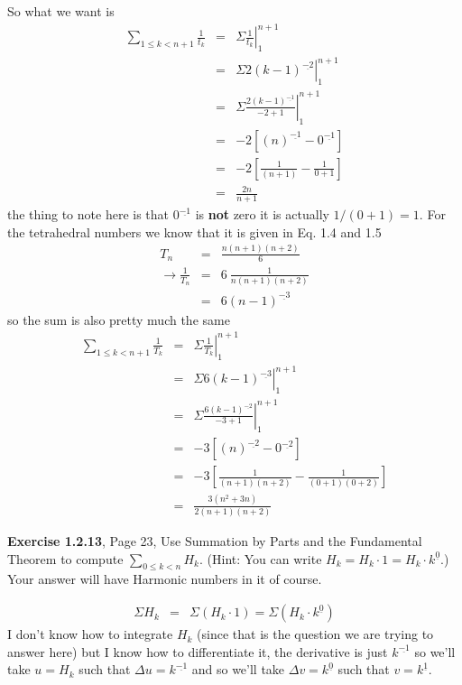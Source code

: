 \documentclass[aps,preprint,preprintnumbers,nofootinbib,showpacs,prd]{revtex4-1}
\newcommand{\nbea}{\begin{eqnarray*}}
\newcommand{\neea}{\end{eqnarray*}}
\begin{document}
So what we want is
%
\nbea
\sum_{1\le k < n+1} \frac{1}{t_k} & = & \left.\Sigma \frac{1}{t_k} \right |_{1}^{n+1} \\
& = & \left.\Sigma 2(k-1)^{\underline{-2}} \right |_{1}^{n+1} \\
& = & \left.\Sigma \frac{2(k-1)^{\underline{-1}}}{-2+1} \right |_{1}^{n+1} \\
& = & -2 \left \lbrack (n)^{\underline{-1}} - 0^{\underline{-1}}\right\rbrack \\
& = & -2\left\lbrack\frac{1}{(n+1)} - \frac{1}{0+1}\right\rbrack \\
& = & \frac{2n}{n+1}
\neea
%
the thing to note here is that $0^{\underline{-1}}$ is {\bf not} zero it is actually $1/(0+1) = 1$. For the tetrahedral numbers we know that it is given in Eq. 1.4 and 1.5
%
\nbea
T_n & = & \frac{n(n+1)(n+2)}{6} \\
\to \frac{1}{T_n} & = & 6~\frac{1}{n(n+1)(n+2)}\\
& = & 6 (n-1)^{\underline{-3}}
\neea
%
so the sum is also pretty much the same
%
\nbea
\sum_{1\le k < n+1} \frac{1}{T_k} & = & \left.\Sigma \frac{1}{T_k} \right |_{1}^{n+1} \\
& = & \left.\Sigma 6(k-1)^{\underline{-3}} \right |_{1}^{n+1} \\
& = & \left.\Sigma \frac{6(k-1)^{\underline{-2}}}{-3+1} \right |_{1}^{n+1} \\
& = & -3 \left \lbrack (n)^{\underline{-2}} - 0^{\underline{-2}}\right\rbrack \\
& = & -3\left\lbrack\frac{1}{(n+1)(n+2)} - \frac{1}{(0+1)(0+2)}\right\rbrack \\
& = & \frac{3(n^2+3n)}{2(n+1)(n+2)}
\neea
%

{\bf Exercise 1.2.13}, Page 23, Use Summation by Parts and the Fundamental Theorem to compute $\sum_{0\le k<n}H_k$. (Hint: You can write $H_k = H_k \cdot 1 = H_k\cdot k^{\underline 0}$.) Your answer will have Harmonic numbers in it of course.

%
\nbea
\Sigma H_k & = & \Sigma (H_k \cdot 1) = \Sigma (H_k\cdot k^{\underline 0})
\neea
%
I don't know how to integrate $H_k$ (since that is the question we are trying to answer here) but I know how to differentiate it, the derivative is just $k^{\underline{-1}}$ so we'll take $u = H_k$ such that $\Delta u = k^{\underline{-1}}$ and so we'll take $\Delta v = k^{\underline 0}$ such that $v = k^{\underline 1}$.
\end{document}
